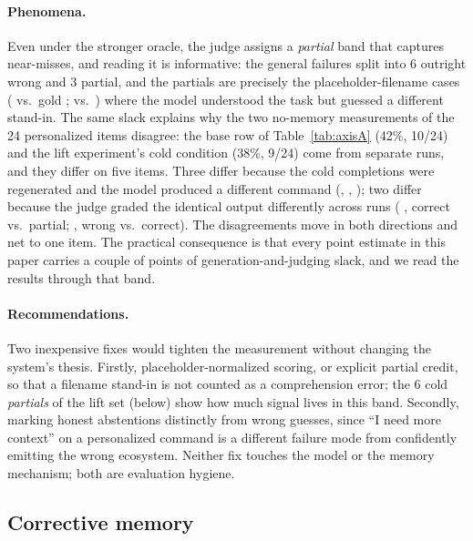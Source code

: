 \paragraph{Phenomena.}
Even under the stronger  oracle, the judge assigns a \emph{partial} band
that captures near-misses, and reading it is informative: the general failures split into
6 outright wrong and 3 partial, and the partials are precisely the placeholder-filename
cases (  vs.\ gold ; 
 vs.\ ) where the model understood the
task but guessed a different stand-in. The same slack explains why the two no-memory
measurements of the 24 personalized items disagree: the base row of
Table~\ref{tab:axisA} (42\%, 10/24) and the lift experiment's cold condition (38\%,
9/24) come from separate runs, and they differ on five items. Three differ because the
cold completions were regenerated and the model produced a different command
(, , ); two differ because the judge graded the identical
output differently across runs ( , correct
vs.\ partial;  , wrong vs.\ correct). The disagreements move
in both directions and net to one item. The practical consequence is that every point
estimate in this paper carries a couple of points of generation-and-judging slack, and
we read the results through that band.

\paragraph{Recommendations.}
Two inexpensive fixes would tighten the measurement without changing the system's
thesis. Firstly, placeholder-normalized scoring, or explicit partial credit, so that a
filename stand-in is not counted as a comprehension error; the 6 cold \emph{partials} of
the lift set (below) show how much signal lives in this band. Secondly, marking honest
abstentions distinctly from wrong guesses, since ``I need more context'' on a
personalized command is a different failure mode from confidently emitting the wrong
ecosystem. Neither fix touches the model or the memory mechanism; both are evaluation
hygiene.

\subsection{Corrective memory}

